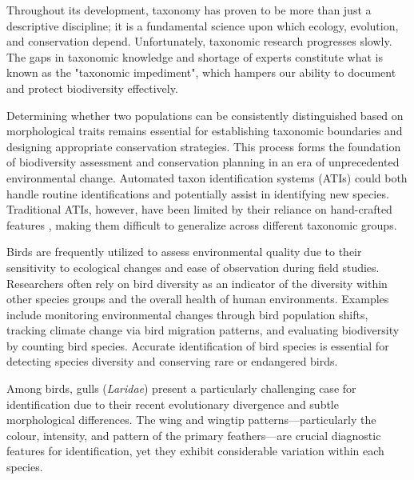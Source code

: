 \documentclass[a4paper,12pt]{article}
\begin{document}
Throughout its development, taxonomy has proven to be more than just a descriptive discipline; it is a fundamental science upon which ecology, evolution, and conservation depend. Unfortunately, taxonomic research progresses slowly. The gaps in taxonomic knowledge and shortage of experts constitute what is known as the "taxonomic impediment"\citep{taxonomicimpediment}, which hampers our ability to document and protect biodiversity effectively.

Determining whether two populations can be consistently distinguished based on morphological traits remains essential for establishing taxonomic boundaries and designing appropriate conservation strategies. This process forms the foundation of biodiversity assessment and conservation planning in an era of unprecedented environmental change. Automated taxon identification systems (ATIs) could both handle routine identifications and potentially assist in identifying new species. Traditional ATIs, however, have been limited by their reliance on hand-crafted features \citep{valan}, making them difficult to generalize across different taxonomic groups.

Birds are frequently utilized to assess environmental quality due to their sensitivity to ecological changes and ease of observation during field studies. Researchers often rely on bird diversity as an indicator of the diversity within other species groups and the overall health of human environments. Examples include monitoring environmental changes through bird population shifts, tracking climate change via bird migration patterns, and evaluating biodiversity by counting bird species. Accurate identification of bird species is essential for detecting species diversity and conserving rare or endangered birds.\citep{ani13020264}

Among birds, gulls (\textit{Laridae}) present a particularly challenging case for identification due to their recent evolutionary divergence and subtle morphological differences. The wing and wingtip patterns—particularly the colour, intensity, and pattern of the primary feathers—are crucial diagnostic features for identification, yet they exhibit considerable variation within each species.
\end{document}
